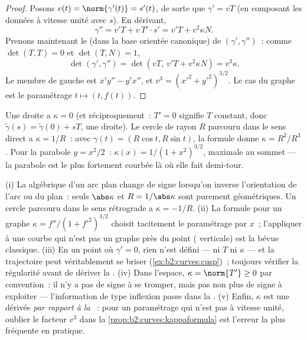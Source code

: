 \begin{proof}
Posons $v(t) = \norm{\gamma'(t)} = s'(t)$, de sorte que $\gamma' = vT$
(en composant les données à vitesse unité avec $s$). En dérivant,
\[
\gamma'' = v'T + v\,T'\cdot s' = v'T + v^2\kappa N .
\]
Prenons maintenant le  (dans la base orientée
canonique) de
$(\gamma', \gamma'')$~: comme $\det(T, T) = 0$ et $\det(T, N) = 1$,
\[
\det(\gamma', \gamma'') = \det(vT,\ v'T + v^2\kappa N)
= v^3\kappa .
\]
Le membre de gauche est $x'y'' - y'x''$, et $v^3 = (x'^2 +
y'^2)^{3/2}$. Le cas du graphe est le paramétrage $t \mapsto (t,
f(t))$.
\end{proof}

\begin{example}\label{ex:b2:curves:kappaexamples}
Une droite a $\kappa = 0$ (et réciproquement~: $T' = 0$ signifie
$T$ constant, donc $\tilde\gamma(s) = \tilde\gamma(0) + sT$, une
droite). Le cercle de rayon $R$ parcouru dans le sens direct a
$\kappa = 1/R$~: avec $\gamma(t) = (R\cos t, R\sin t)$, la formule
donne $\kappa = R^2/R^3$. Pour la parabole $y = x^2/2$~:
$\kappa(x) = 1/(1 + x^2)^{3/2}$, maximale au sommet --- la parabole
est le plus fortement courbée là où elle fait demi-tour.
\end{example}

\begin{remark}
(i) La  algébrique d'un arc plan change de signe lorsqu'on
inverse l'orientation de l'arc ou du plan~: seuls
$\abs\kappa$ et $R = 1/\abs\kappa$ sont purement géométriques. Un
cercle parcouru dans le sens rétrograde a $\kappa = -1/R$. (ii) La
formule pour un graphe $\kappa = f''/(1 + f'^2)^{3/2}$ choisit
tacitement le paramétrage par $x$~; l'appliquer à une courbe
qui n'est pas un graphe près du point ( verticale) est la
bévue classique. (iii) En un point où $\gamma' = 0$,
rien n'est défini --- ni $T$ ni $\kappa$ --- et la
trajectoire peut véritablement se briser
(\cref{ex:b2:curves:cusp})~; toujours vérifier la régularité avant
de dériver la  . (iv) Dans l'espace, $\kappa =
\norm{T'} \geq 0$ par convention~: il n'y a pas de signe à se
tromper, mais pas non plus de signe à exploiter --- l'information
de type inflexion passe dans la . (v) Enfin, $\kappa$ est
une dérivée \emph{par rapport à la }~: pour un
paramétrage qui n'est pas à vitesse unité, oublier le facteur $v^3$
dans la \cref{prop:b2:curves:kappaformula} est l'erreur la plus
fréquente en pratique.
\end{remark}

